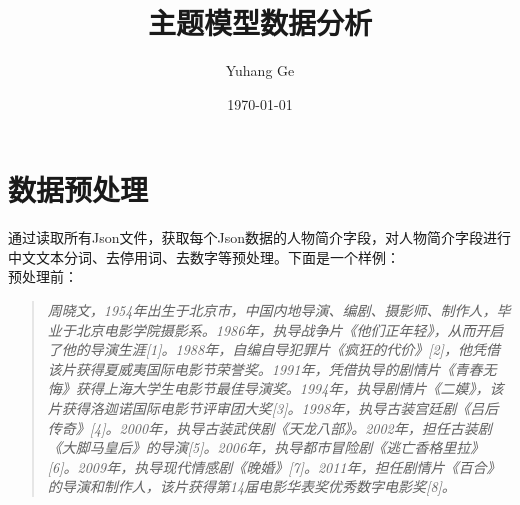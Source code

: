 \documentclass{article} [NO-DEFAULT-PACKAGES] \usepackage{wx672hyperref}
\author{Yuhang Ge}
\date{\today}
\title{主题模型数据分析}
\begin{document}


  
\maketitle

\section{数据预处理}
\label{sec:org75ad168}
通过读取所有Json文件，获取每个Json数据的人物简介字段，对人物简介字段进行中文文本分词、去停用词、去数字等预处理。下面是一个样例：\\

预处理前：

\begin{quotation}
\textit{周晓文，1954年出生于北京市，中国内地导演、编剧、摄影师、制作人，毕业于北京电影学院摄影系。1986年，执导战争片《他们正年轻》，从而开启了他的导演生涯[1]。1988年，自编自导犯罪片《疯狂的代价》[2]，他凭借该片获得夏威夷国际电影节荣誉奖。1991年，凭借执导的剧情片《青春无悔》获得上海大学生电影节最佳导演奖。1994年，执导剧情片《二嫫》，该片获得洛迦诺国际电影节评审团大奖[3]。1998年，执导古装宫廷剧《吕后传奇》[4]。2000年，执导古装武侠剧《天龙八部》。2002年，担任古装剧《大脚马皇后》的导演[5]。2006年，执导都市冒险剧《逃亡香格里拉》[6]。2009年，执导现代情感剧《晚婚》[7]。2011年，担任剧情片《百合》的导演和制作人，该片获得第14届电影华表奖优秀数字电影奖[8]。}
\end{quotation}
\end{document}
